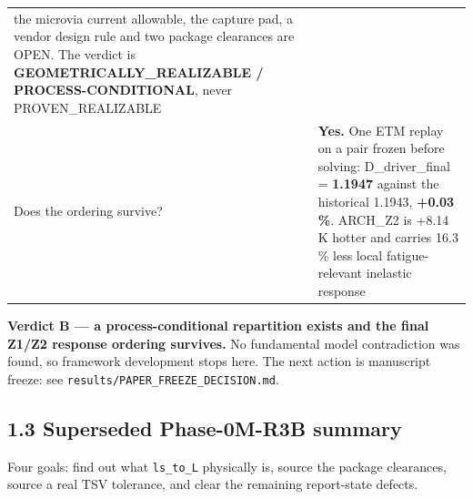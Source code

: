 \documentclass[10pt,]{article}
\begin{document}
\begin{longtable}[]{@{}ll@{}}
\begin{minipage}[t]{0.47\columnwidth}
the microvia current allowable, the capture pad, a vendor design rule
and two package clearances are OPEN. The verdict is
\textbf{GEOMETRICALLY\_REALIZABLE / PROCESS-CONDITIONAL}, never
PROVEN\_REALIZABLE\strut
\end{minipage}\tabularnewline
\begin{minipage}[t]{0.47\columnwidth}\raggedright
Does the ordering survive?\strut
\end{minipage} & \begin{minipage}[t]{0.47\columnwidth}\raggedright
\textbf{Yes.} One ETM replay on a pair frozen before solving:
D\_driver\_final = \textbf{1.1947} against the historical 1.1943,
\textbf{+0.03 \%}. ARCH\_Z2 is +8.14 K hotter and carries 16.3 \% less
local fatigue-relevant inelastic response\strut
\end{minipage}\tabularnewline
\bottomrule
\end{longtable}

\textbf{Verdict B --- a process-conditional repartition exists and the
final Z1/Z2 response ordering survives.} No fundamental model
contradiction was found, so framework development stops here. The next
action is manuscript freeze: see
\texttt{results/PAPER\_FREEZE\_DECISION.md}.

\newpage

\hypertarget{superseded-phase-0m-r3b-summary}{%
\subsection{1.3 Superseded Phase-0M-R3B
summary}\label{superseded-phase-0m-r3b-summary}}

Four goals: find out what \texttt{ls\_to\_L} physically is, source the
package clearances, source a real TSV tolerance, and clear the remaining
report-state defects.
\end{document}
